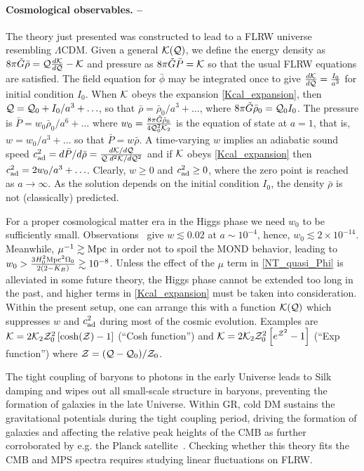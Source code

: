 \documentclass[twocolumn,prl,preprintnumbers,amsmath,amssymb,nofootinbib]{revtex4-2}
\newcommand{\Mpc}{\ensuremath{{\rm Mpc}}}
\newcommand{\rhob}{{\bar{\rho}}}
\newcommand{\Pb}{{\bar{P}}}
\newcommand{\phib}{{\bar{\phi}}}
\newcommand{\Kcal}{{\cal K}}
\newcommand{\Zcal}{{\cal Z}}
\newcommand{\Qcal}{{\cal Q}}
\newcommand{\Gt}{\ensuremath{\tilde{G}}}
\newcommand{\KB}{\ensuremath{K_{B}}}
\newcommand{\cad}{c_{\rm ad}}
\begin{document}
\paragraph{Cosmological observables. --}
The theory just presented was constructed to lead to a FLRW universe resembling $\Lambda$CDM. Given a general $\Kcal(\Qcal)$,
we define the energy density as $8\pi \Gt \rhob =  \Qcal \frac{d\Kcal}{d\Qcal} - \Kcal$ and pressure as $8\pi \Gt\Pb = \Kcal$ so that the usual FLRW equations are satisfied.
The field equation for $\phib$ may be integrated once to give $\frac{d\Kcal}{d\Qcal} = \frac{I_0}{a^3}$ for initial condition $I_0$.
When $\Kcal$ obeys the expansion \eqref{Kcal_expansion}, then $\Qcal = \Qcal_0 + I_0/a^3 + \ldots$, so that
$\rhob = \rhob_0/a^3 + \ldots$, where $8\pi \Gt \rhob_0 = \Qcal_0 I_0$.
 The pressure is $\Pb =  w_0 \rhob_0/a^6  + \ldots$ 
where $w_0=  \frac{8\pi \Gt\rhob_0}{4\Qcal_0^2 \Kcal_2}$ is the equation of state at $a=1$, that is,
 $w = w_0/a^3 + \ldots$
so that $\Pb = w \rhob$. A time-varying $w$ implies an adiabatic sound speed 
$\cad^2 = d\Pb/d\rhob = \frac{d\Kcal/d\Qcal }{   \Qcal \; d^2\Kcal/d\Qcal^2 } $ and
if $\Kcal$ obeys  \eqref{Kcal_expansion} then $\cad^2 = 2 w_0/a^3 + \ldots$.
Clearly, $w\ge 0$ and  $\cad^2\ge 0$, where the zero point is reached as $a\rightarrow \infty$.
As the solution depends on the initial condition $I_0$,  the density $\rhob$ is not (classically) predicted.

For a proper  cosmological matter era in the Higgs phase we need $w_0$ to be sufficiently small.
Observations~\cite{KoppEtAl2018,IlicEtAl2020} give $w\lesssim 0.02$ at $a\sim 10^{-4}$,
hence, $w_0 \lesssim  2 \times 10^{-14}$.  Meanwhile,  $\mu^{-1} \gtrsim \Mpc$ in order not to spoil the MOND behavior, leading to $w_0>\frac{3H_0^2 \Mpc^2 \Omega_0}{2(2-\KB)}\gtrsim 10^{-8}$. Unless 
the effect of the $\mu$ term in \eqref{NT_quasi_Phi}  is alleviated in some future theory,
the Higgs phase cannot be extended too long in the past, and higher terms in  \eqref{Kcal_expansion} must be taken into consideration. 
Within the present setup, one can arrange this with a function $\Kcal(\Qcal)$ which 
suppresses $w$ and $\cad^2$ during most of the cosmic evolution. Examples are $\Kcal = 2 \Kcal_2 \Zcal_0^2 \left[ \cosh(\Zcal)-1 \right]$ 
 (``Cosh function'') and $\Kcal = 2 \Kcal_2 \Zcal_0^2 \left[ e^{\Zcal^2} -1\right]$ (``Exp function'') where $\Zcal = (\Qcal-\Qcal_0)/\Zcal_0$.


The tight coupling of baryons to photons in the early Universe leads to Silk damping 
and wipes out all small-scale structure in baryons, preventing the formation of galaxies in the late Universe.
Within GR, cold DM sustains the gravitational potentials during the tight coupling period,  driving the formation of galaxies
and affecting the relative peak heights of the CMB as further corroborated by e.g. the Planck satellite~\cite{Aghanim:2018eyx}. Checking whether 
this theory fits the CMB and MPS spectra requires studying linear fluctuations on FLRW.
\end{document}
